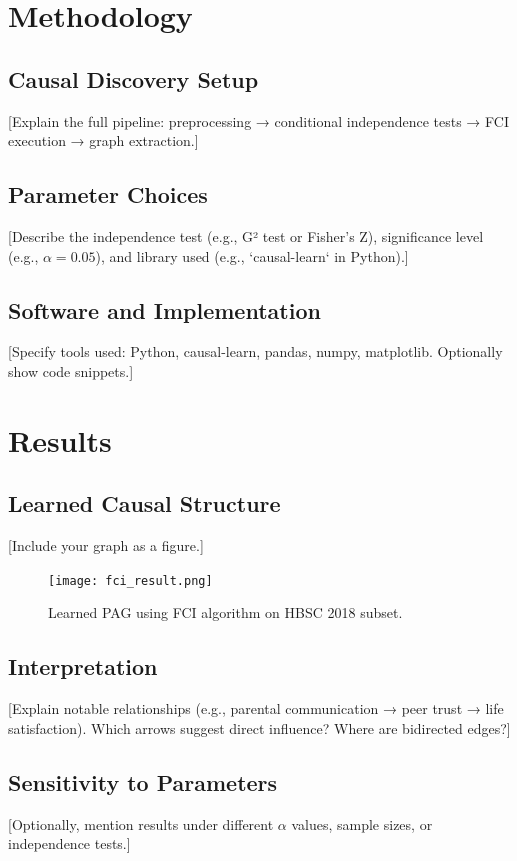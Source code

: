 \documentclass[a4paper]{article}
\begin{document}
\section{Methodology}
\label{sec:methodology}

\subsection{Causal Discovery Setup}
[Explain the full pipeline: preprocessing → conditional independence tests → FCI execution → graph extraction.]

\subsection{Parameter Choices}
[Describe the independence test (e.g., G² test or Fisher's Z), significance level (e.g., $\alpha = 0.05$), and library used (e.g., `causal-learn` in Python).]

\subsection{Software and Implementation}
[Specify tools used: Python, causal-learn, pandas, numpy, matplotlib. Optionally show code snippets.]

\section{Results}
\label{sec:results}

\subsection{Learned Causal Structure}
[Include your graph as a figure.]

\begin{figure}[h]
\centering
\texttt{[image: fci\_result.png]}
\caption{Learned PAG using FCI algorithm on HBSC 2018 subset.}
\label{fig:fci_graph}
\end{figure}

\subsection{Interpretation}
[Explain notable relationships (e.g., parental communication → peer trust → life satisfaction). Which arrows suggest direct influence? Where are bidirected edges?]

\subsection{Sensitivity to Parameters}
[Optionally, mention results under different $\alpha$ values, sample sizes, or independence tests.]
\end{document}

